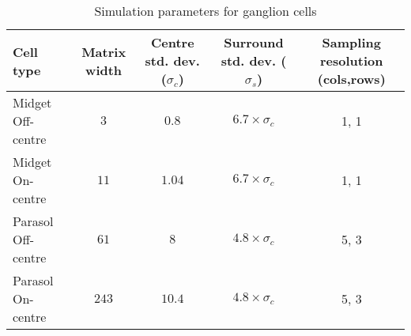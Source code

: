 \begin{table}[htb]
  \caption{Simulation parameters for ganglion cells}
  \centering
  \begin{tabular}{l c c c c}
    \begin{minipage}{1.2cm}Cell type \end{minipage}& 
    \begin{minipage}{1cm} \centering Matrix width \end{minipage}&  
    \begin{minipage}{1.3cm}\centering Centre std. dev. ($\sigma_c$)\vspace*{0.1cm}\end{minipage} & 
    \begin{minipage}{1.3cm}\centering Surround std. dev. ($\sigma_s$)\vspace*{0.1cm}\end{minipage} & 
    \begin{minipage}{1.3cm}\centering Sampling resolution (cols,rows)\vspace*{0.1cm}\end{minipage} \\
    \hline
    \begin{minipage}{1.32cm}\vspace*{0.1cm} Midget Off-centre \vspace*{0.005cm} \end{minipage}& 
    \begin{minipage}{1cm}\centering$3$ \end{minipage}& 
    $0.8$ & $6.7 \times \sigma_c$ &  1, 1 \\
    \begin{minipage}{1.32cm} Midget On-centre \vspace*{0.005cm}\end{minipage} & 
    \begin{minipage}{1cm}\centering $11$ \end{minipage}& 
    $1.04$ & $6.7 \times \sigma_c$ & 1, 1 \\
    \begin{minipage}{1.32cm}Parasol Off-centre \vspace*{0.005cm}\end{minipage} & 
    \begin{minipage}{1cm}\centering $61$ \end{minipage}& 
    $8$ & $4.8 \times \sigma_c$ & 5, 3 \\
    \begin{minipage}{1.32cm} Parasol On-centre \vspace*{0.005cm}\end{minipage} & 
    \begin{minipage}{1cm}\centering $243$\end{minipage} &
    $10.4$ & $4.8 \times \sigma_c$ & 5, 3 
  \end{tabular}
  \label{tab-kernel-specs}
\end{table}

